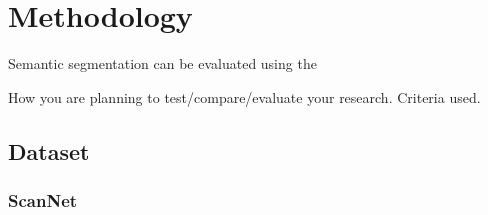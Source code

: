 

    \chapter{Methodology}
	\label{chap:methodology}
	
	Semantic segmentation can be evaluated using the 
	
    How you are planning to test/compare/evaluate your research.
    Criteria used.

    \section{Dataset}
    \subsection{ScanNet}
    
